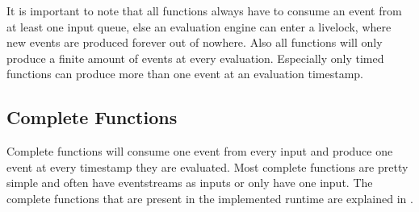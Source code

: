 It is important to note that all functions always have to consume an event from at least one input queue, else an evaluation engine can enter a livelock, where new events are produced forever out of nowhere.
Also all functions will only produce a finite amount of events at every evaluation.
Especially only timed functions can produce more than one event at an evaluation timestamp.

\subsection{Complete Functions}
\label{sec:definitions:tessla_functions:complete}

Complete functions will consume one event from every input and produce one event at every timestamp they are evaluated.
Most complete functions are pretty simple and often have eventstreams as inputs or only have one input.
The complete functions that are present in the implemented runtime are explained in .

